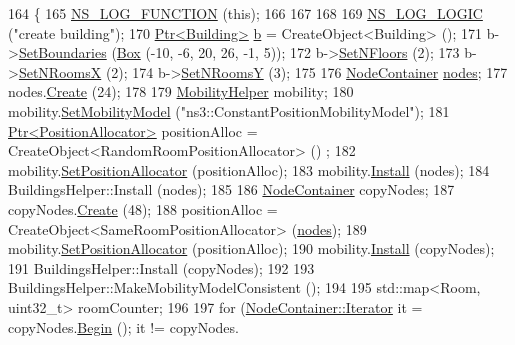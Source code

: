 \begin{DoxyCode}
164 \{
165   \hyperlink{log-macros-disabled_8h_a90b90d5bad1f39cb1b64923ea94c0761}{NS\_LOG\_FUNCTION} (\textcolor{keyword}{this});
166 
167  
168 
169   \hyperlink{group__logging_ga88acd260151caf2db9c0fc84997f45ce}{NS\_LOG\_LOGIC} (\textcolor{stringliteral}{"create building"});
170   \hyperlink{classns3_1_1Ptr}{Ptr<Building>} \hyperlink{buildings__pathloss_8m_a21ad0bd836b90d08f4cf640b4c298e7c}{b} = CreateObject<Building> ();
171   b->\hyperlink{classns3_1_1Building_a4b69659f05a983f06e33e7db62415915}{SetBoundaries} (\hyperlink{classns3_1_1Box}{Box} (-10, -6, 20, 26, -1, 5));
172   b->\hyperlink{classns3_1_1Building_ae9f97075b5c8bf4685703e30ed049791}{SetNFloors} (2);
173   b->\hyperlink{classns3_1_1Building_a60eac680f1059fb9d883a659607e2fae}{SetNRoomsX} (2);
174   b->\hyperlink{classns3_1_1Building_a9103ee5b5edf013624d7e18422c4ba06}{SetNRoomsY} (3);
175 
176   \hyperlink{classns3_1_1NodeContainer}{NodeContainer} \hyperlink{visualizer-ideas_8txt_a3e1b3808014a2c68ab0cd0182e041be2}{nodes};
177   nodes.\hyperlink{classns3_1_1NodeContainer_a787f059e2813e8b951cc6914d11dfe69}{Create} (24);
178 
179   \hyperlink{classns3_1_1MobilityHelper}{MobilityHelper} mobility;
180   mobility.\hyperlink{classns3_1_1MobilityHelper_a030275011b6f40682e70534d30280aba}{SetMobilityModel} (\textcolor{stringliteral}{"ns3::ConstantPositionMobilityModel"});
181   \hyperlink{classns3_1_1Ptr}{Ptr<PositionAllocator>} positionAlloc = CreateObject<RandomRoomPositionAllocator> ()
      ;
182   mobility.\hyperlink{classns3_1_1MobilityHelper_ac59d5295076be3cc11021566713a28c5}{SetPositionAllocator} (positionAlloc);
183   mobility.\hyperlink{classns3_1_1MobilityHelper_a07737960ee95c0777109cf2994dd97ae}{Install} (nodes);
184   BuildingsHelper::Install (nodes);
185 
186   \hyperlink{classns3_1_1NodeContainer}{NodeContainer} copyNodes;
187   copyNodes.\hyperlink{classns3_1_1NodeContainer_a787f059e2813e8b951cc6914d11dfe69}{Create} (48);
188   positionAlloc = CreateObject<SameRoomPositionAllocator> (\hyperlink{visualizer-ideas_8txt_a3e1b3808014a2c68ab0cd0182e041be2}{nodes});
189   mobility.\hyperlink{classns3_1_1MobilityHelper_ac59d5295076be3cc11021566713a28c5}{SetPositionAllocator} (positionAlloc);
190   mobility.\hyperlink{classns3_1_1MobilityHelper_a07737960ee95c0777109cf2994dd97ae}{Install} (copyNodes);
191   BuildingsHelper::Install (copyNodes);
192 
193   BuildingsHelper::MakeMobilityModelConsistent ();
194 
195   std::map<Room, uint32\_t> roomCounter;
196 
197   \textcolor{keywordflow}{for} (\hyperlink{classns3_1_1NodeContainer_aa1a9f2d2b09bfef7d066d3974bca2cc4}{NodeContainer::Iterator} it = copyNodes.\hyperlink{classns3_1_1NodeContainer_adf0f639aff139db107526288777eb533}{Begin} (); it != copyNodes.

\end{DoxyCode}
